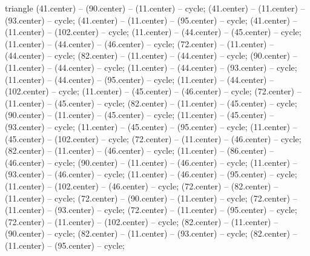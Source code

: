 \begin{pgfonlayer}{triangle}
 (41.center) -- (90.center) -- (11.center) -- cycle; 
 (41.center) -- (11.center) -- (93.center) -- cycle; 
 (41.center) -- (11.center) -- (95.center) -- cycle; 
 (41.center) -- (11.center) -- (102.center) -- cycle; 
 (11.center) -- (44.center) -- (45.center) -- cycle; 
 (11.center) -- (44.center) -- (46.center) -- cycle; 
 (72.center) -- (11.center) -- (44.center) -- cycle; 
 (82.center) -- (11.center) -- (44.center) -- cycle; 
 (90.center) -- (11.center) -- (44.center) -- cycle; 
 (11.center) -- (44.center) -- (93.center) -- cycle; 
 (11.center) -- (44.center) -- (95.center) -- cycle; 
 (11.center) -- (44.center) -- (102.center) -- cycle; 
 (11.center) -- (45.center) -- (46.center) -- cycle; 
 (72.center) -- (11.center) -- (45.center) -- cycle; 
 (82.center) -- (11.center) -- (45.center) -- cycle; 
 (90.center) -- (11.center) -- (45.center) -- cycle; 
 (11.center) -- (45.center) -- (93.center) -- cycle; 
 (11.center) -- (45.center) -- (95.center) -- cycle; 
 (11.center) -- (45.center) -- (102.center) -- cycle; 
 (72.center) -- (11.center) -- (46.center) -- cycle; 
 (82.center) -- (11.center) -- (46.center) -- cycle; 
 (11.center) -- (86.center) -- (46.center) -- cycle; 
 (90.center) -- (11.center) -- (46.center) -- cycle; 
 (11.center) -- (93.center) -- (46.center) -- cycle; 
 (11.center) -- (46.center) -- (95.center) -- cycle; 
 (11.center) -- (102.center) -- (46.center) -- cycle; 
 (72.center) -- (82.center) -- (11.center) -- cycle; 
 (72.center) -- (90.center) -- (11.center) -- cycle; 
 (72.center) -- (11.center) -- (93.center) -- cycle; 
 (72.center) -- (11.center) -- (95.center) -- cycle; 
 (72.center) -- (11.center) -- (102.center) -- cycle; 
 (82.center) -- (11.center) -- (90.center) -- cycle; 
 (82.center) -- (11.center) -- (93.center) -- cycle; 
 (82.center) -- (11.center) -- (95.center) -- cycle; 

\end{pgfonlayer}
